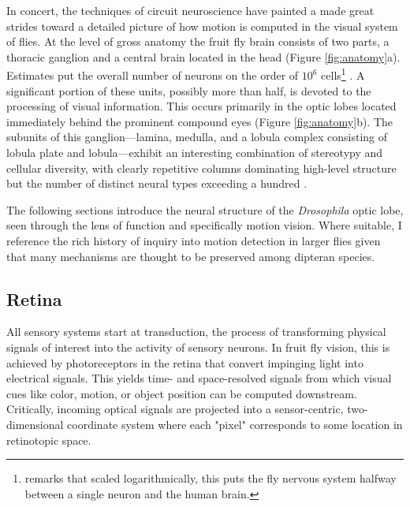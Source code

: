 In concert, the techniques of circuit neuroscience have painted a made great strides toward a detailed picture of how motion is computed in the visual system of flies. At the level of gross anatomy the fruit fly brain consists of two parts, a thoracic ganglion and a central brain located in the head (Figure \ref{fig:anatomy}a). Estimates put the overall number of neurons on the order of $10^6$ cells\footnote{\citet{Benzer:1967aa} remarks that scaled logarithmically, this puts the fly nervous system halfway between a single neuron and the human brain.} \citep{Morante:2004aa}. A significant portion of these units, possibly more than half, is devoted to the processing of visual information. This occurs primarily in the optic lobes located immediately behind the prominent compound eyes (Figure \ref{fig:anatomy}b). The subunits of this ganglion---lamina, medulla, and a lobula complex consisting of lobula plate and lobula---exhibit an interesting combination of stereotypy and cellular diversity, with clearly repetitive columns dominating high-level structure but the number of distinct neural types exceeding a hundred \citep{Fischbach:1989uw}.

The following sections introduce the neural structure of the \textit{Drosophila} optic lobe, seen through the lens of function and specifically motion vision. Where suitable, I reference the rich history of inquiry into motion detection in larger flies given that many mechanisms are thought to be preserved among dipteran species.


\subsection{Retina}
All sensory systems start at transduction, the process of transforming physical signals of interest into the activity of sensory neurons. In fruit fly vision, this is achieved by photoreceptors in the retina that convert impinging light into electrical signals. This yields time- and space-resolved signals from which visual cues like color, motion, or object position can be computed downstream. Critically, incoming optical signals are projected into a sensor-centric, two-dimensional coordinate system where each "pixel" corresponds to some location in retinotopic space.

